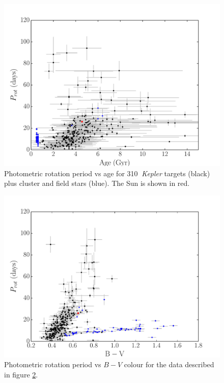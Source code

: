 \documentclass[11pt,preprint]{aastex}
\newcommand{\nastero}{310}
\begin{document}



\begin{figure}[ht]
\begin{center}
\includegraphics[width=6in, clip=true, trim=0 0 0.5in 0]{p_vs_a_paper2.pdf}
\caption{Photometric rotation period vs age for \nastero$~$ {\it Kepler}
	targets (black) plus cluster and field stars (blue). The Sun is shown
	in red.
\label{fig:p_vs_a}}
\end{center}
\end{figure}

\begin{figure}[ht]
\begin{center}
\includegraphics[width=6in, clip=true, trim=0 0 0.5in 0]{p_vs_bv_paper2.pdf}
\caption{Photometric rotation period vs $B-V$ colour for the data described in
	figure \ref{fig:3d}.
\label{fig:3d}}
\end{center}
\end{figure}
\end{document}
